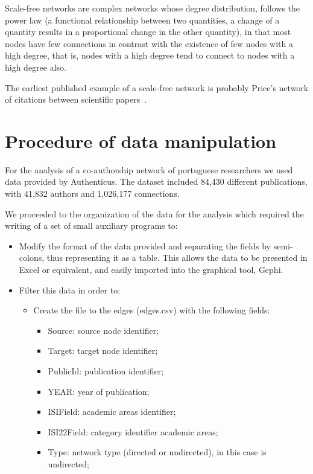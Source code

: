 \documentclass{article}
\begin{document}
\begin{multicols}{2}
Scale-free networks are complex networks whose degree distribution, follows the power law (a functional relationship between two quantities, a change of a quantity results in a proportional change in the other quantity), in that most nodes have few connections in contrast with the existence of few nodes with a high degree, that is, nodes with a high degree tend to connect to nodes with a high degree also.

The earliest published example of a scale-free network is probably Price’s network of citations between scientific papers~\cite{newman2003structure}.


\section{Procedure of data manipulation}
\label{section.data}

For the analysis of a co-authorship network of portuguese researchers we used data provided by Authenticus. The dataset included 84,430 different publications, with 41,832 authors and 1,026,177 connections.

We proceeded to the organization of the data for the analysis which required the writing of a set of small auxiliary programs to:

\begin{itemize}
\item Modify the format of the data provided and separating the fields by semi-colons, thus representing it as a table. This allows the data to be presented in Excel or equivalent, and easily imported into the graphical tool, Gephi.

\item Filter this data in order to:
\begin{itemize}
\item Create the file to the edges (edges.csv) with the following fields:
\begin{itemize}
\item Source: source node identifier;
\item Target: target node identifier;
\item PublicId: publication identifier;
\item YEAR: year of publication;
\item ISIField: academic areas identifier;
\item ISI22Field: category identifier academic areas;
\item Type: network type (directed or undirected), in this case is undirected;
\end{itemize}


\end{itemize}
\end{itemize}
\end{multicols}
\end{document}
